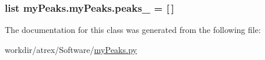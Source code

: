 \hypertarget{classmy_peaks_1_1my_peaks_acba3b1f63dcd097b793f8cbcb0e0befc}{
\subsubsection[{peaks\-\_\-1}]{\setlength{\rightskip}{0pt plus 5cm}list my\-Peaks.\-my\-Peaks.\-peaks\-\_ = \mbox{[}$\,$\mbox{]}\hspace{0.3cm}{\ttfamily [static]}}}\label{classmy_peaks_1_1my_peaks_acba3b1f63dcd097b793f8cbcb0e0befc}


The documentation for this class was generated from the following file\-:\begin{DoxyCompactItemize}
\item 
workdir/atrex/\-Software/\hyperlink{my_peaks_8py}{my\-Peaks.\-py}\end{DoxyCompactItemize}
